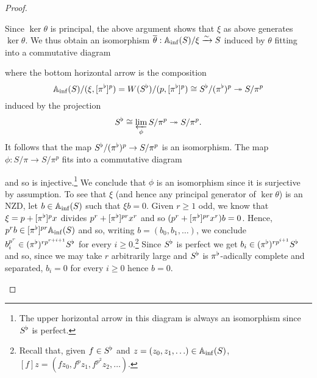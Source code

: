 \documentclass[11pt]{article}
\begin{document}
\begin{proof}
\begin{enum}{\alph}
\item Since $\ker\theta$ is principal, the above argument shows that $\xi$ as above generates $\ker\theta$. We thus obtain an isomorphism $\overline{\theta}: \mathbb{A}_{\inf}(S)/\xi\xrightarrow{\sim}S$ induced by $\theta$ fitting into a commutative diagram
\begin{center}
\end{center}
where the bottom horizontal arrow is the composition 
$$\mathbb{A}_{\inf}(S)/(\xi,[\pi^{\flat}]^p)=W(S^{\flat})/(p,[\pi^{\flat}]^p)\cong S^{\flat}/(\pi^{\flat})^p\twoheadrightarrow S/\pi^p$$
induced by the projection 
$$S^{\flat}\cong\displaystyle\varprojlim_{\phi}S/\pi^p\twoheadrightarrow S/\pi^p.$$
It follows that the map $S^{\flat}/(\pi^{\flat})^p\to S/\pi^p$ is an isomorphism. The map $\phi: S/\pi\to S/\pi^p$ fits into a commutative diagram
\begin{center}
\end{center}
and so is injective.\footnote{The upper horizontal arrow in this diagram is always an isomorphism since $S^{\flat}$ is perfect.} We conclude that $\phi$ is an isomorphism since it is surjective by assumption. To see that $\xi$ (and hence any principal generator of $\ker\theta$) is an NZD, let $b\in\mathbb{A}_{\inf}(S)$ such that $\xi b=0$. Given $r\geq1$ odd, we know that $\xi=p+[\pi^{\flat}]^px$ divides $p^r+[\pi^{\flat}]^{pr}x^r$ and so $(p^r+[\pi^{\flat}]^{pr}x^r)b=0$. Hence, $p^rb\in[\pi^{\flat}]^{pr}\mathbb{A}_{\inf}(S)$ and so, writing $b=(b_0,b_1,\ldots)$, we conclude $b_i^{p^r}\in(\pi^{\flat})^{rp^{r+i+1}}S^{\flat}$ for every $i\geq0$.\footnote{Recall that, given $f\in S^{\flat}$ and $z=(z_0,z_1,\ldots)\in\mathbb{A}_{\inf}(S)$, $[f]z=(fz_0,f^pz_1,f^{p^2}z_2,\ldots)$.} Since $S^{\flat}$ is perfect we get $b_i\in(\pi^{\flat})^{rp^{i+1}}S^{\flat}$ and so, since we may take $r$ arbitrarily large and $S^{\flat}$ is $\pi^{\flat}$-adically complete and separated, $b_i=0$ for every $i\geq0$ hence $b=0$.


\end{enum}
\end{proof}
\end{document}
